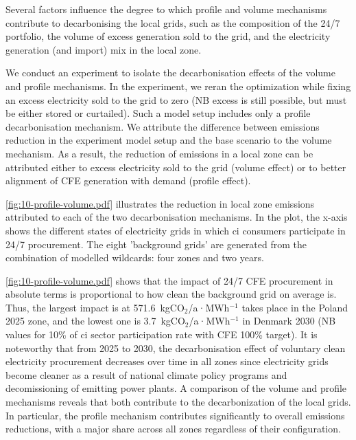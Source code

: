 Several factors influence the degree to which profile and volume mechanisms contribute to decarbonising the local grids, such as the composition of the 24/7 portfolio, the volume of excess generation sold to the grid, and the electricity generation (and import) mix in the local zone.

We conduct an experiment to isolate the decarbonisation effects of the volume and profile mechanisms.
In the experiment, we reran the optimization while fixing an excess electricity sold to the grid to zero (NB excess is still possible, but must be either stored or curtailed). 
Such a model setup includes only a profile decarbonisation mechanism. 
We attribute the difference between emissions reduction in the experiment model setup and the base scenario to the volume mechanism.
As a result, the reduction of emissions in a local zone can be attributed either to excess electricity sold to the grid (volume effect) or to better alignment of CFE generation with demand (profile effect).

\cref{fig:10-profile-volume.pdf} illustrates the reduction in local zone emissions attributed to each of the two decarbonisation mechanisms.
In the plot, the x-axis shows the different states of electricity grids in which \gls{ci} consumers participate in 24/7 procurement.
The eight 'background grids' are generated from the combination of modelled wildcards: four zones and two years.

\cref{fig:10-profile-volume.pdf} shows that the impact of 24/7 CFE procurement in absolute terms is proportional to how clean the background grid on average is.
Thus, the largest impact is at 571.6~kgCO$_2$/a·MWh$^{-1}$ takes place in the Poland 2025 zone, and the lowest one is 3.7~kgCO$_2$/a·MWh$^{-1}$ in Denmark 2030 (NB values for 10\% of \gls{ci} sector participation rate with CFE 100\% target).
It is noteworthy that from 2025 to 2030, the decarbonisation effect of voluntary clean electricity procurement decreases over time in all zones since electricity grids become cleaner as a result of national climate policy programs and decomissioning of emitting power plants.
A comparison of the volume and profile mechanisms reveals that both contribute to the decarbonization of the local grids.
In particular, the profile mechanism contributes significantly to overall emissions reductions, with a major share across all zones regardless of their configuration.


